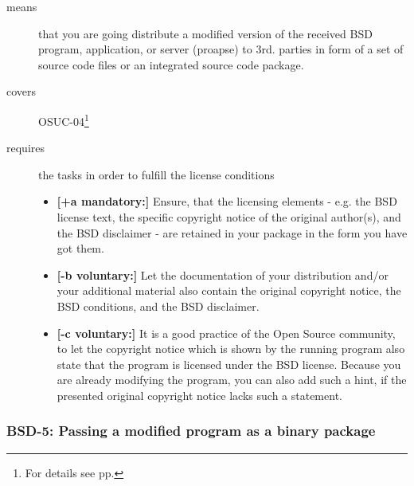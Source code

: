 \begin{description}
\item[means] that you are going distribute a modified version of the received
BSD program, application, or server (proapse) to 3rd. parties in form of a set
of source code files or an integrated source code package.
\item[covers] OSUC-04\footnote{For details see pp. \pageref{OSUC-04-DEF}}
\item[requires] the tasks in order to fulfill the license conditions
\begin{itemize}
  \item \textbf{[+a mandatory:]} Ensure, that the licensing elements - e.g.
  the BSD license text, the specific copyright notice of the original author(s),
  and the BSD disclaimer - are retained in your package in the form you have got
  them. 
  \item \textbf{[-b voluntary:]} Let the documentation of your distribution
  and/or your additional material also contain the original copyright notice, the
  BSD conditions, and the BSD disclaimer.
  
  \item \textbf{[-c voluntary:]} It is a good practice of the Open Source
  community, to let the copyright notice which is shown by the running program
  also state that the program is licensed under the BSD license. Because you are
  already modifying the program, you can also add such a hint, if the presented
  original copyright notice lacks such a statement.
\end{itemize}
\end{description}

\subsubsection{BSD-5: Passing a modified program as a binary package}

